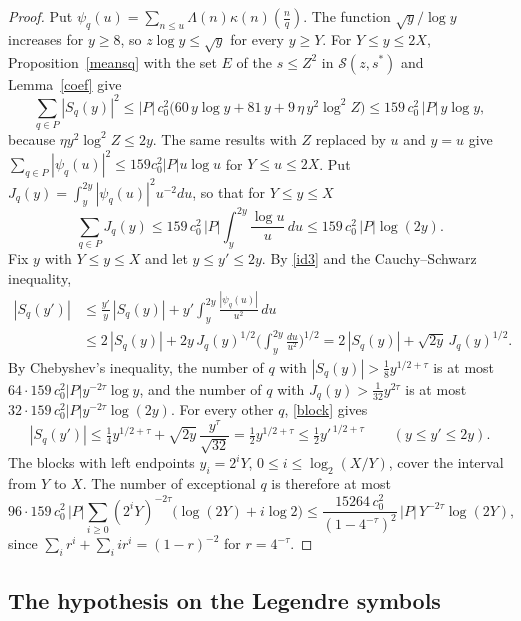 \documentclass[11pt,letterpaper]{article}
\numberwithin{equation}{section}
\begin{document}
\begin{proof}
Put $\psi_q(u)=\sum_{n\le u}\Lambda(n)\kappa(n)(\tfrac nq)$. The function $\sqrt y/\log y$ increases for $y\ge8$, so $z\log y\le\sqrt y$ for every $y\ge Y$. For $Y\le y\le2X$, Proposition~\ref{meansq} with the set $E$ of the $s\le Z^2$ in $\mathcal S(z,s^\ast)$ and Lemma~\ref{coef} give
\[
\sum_{q\in P}|S_q(y)|^2\le|P|\,c_0^2\Big(60\,y\log y+81\,y+9\,\eta\,y^2\log^2Z\Big)\le159\,c_0^2\,|P|\,y\log y ,
\]
because $\eta y^2\log^2Z\le2y$. The same results with $Z$ replaced by $u$ and $y=u$ give $\sum_{q\in P}|\psi_q(u)|^2\le159c_0^2|P|u\log u$ for $Y\le u\le2X$. Put $J_q(y)=\int_y^{2y}|\psi_q(u)|^2u^{-2}du$, so that for $Y\le y\le X$
\[
\sum_{q\in P}J_q(y)\le159\,c_0^2\,|P|\int_y^{2y}\frac{\log u}u\,du\le159\,c_0^2\,|P|\log(2y).
\]
Fix $y$ with $Y\le y\le X$ and let $y\le y'\le2y$. By \eqref{id3} and the Cauchy--Schwarz inequality,
\begin{equation}\label{block}
\begin{aligned}
|S_q(y')|&\le\frac{y'}y\,|S_q(y)|+y'\int_y^{2y}\frac{|\psi_q(u)|}{u^2}\,du\\
&\le2\,|S_q(y)|+2y\,J_q(y)^{1/2}\Big(\int_y^{2y}\frac{du}{u^2}\Big)^{1/2}=2\,|S_q(y)|+\sqrt{2y}\,J_q(y)^{1/2}.
\end{aligned}
\end{equation}
By Chebyshev's inequality, the number of $q$ with $|S_q(y)|>\tfrac18y^{1/2+\tau}$ is at most $64\cdot159\,c_0^2|P|y^{-2\tau}\log y$, and the number of $q$ with $J_q(y)>\tfrac1{32}y^{2\tau}$ is at most $32\cdot159\,c_0^2|P|y^{-2\tau}\log(2y)$. For every other $q$, \eqref{block} gives
\[
|S_q(y')|\le\tfrac14y^{1/2+\tau}+\sqrt{2y}\,\frac{y^{\tau}}{\sqrt{32}}=\tfrac12y^{1/2+\tau}\le\tfrac12y'^{\,1/2+\tau}\qquad(y\le y'\le2y).
\]
The blocks with left endpoints $y_i=2^iY$, $0\le i\le\log_2(X/Y)$, cover the interval from $Y$ to $X$. The number of exceptional $q$ is therefore at most
\[
96\cdot159\,c_0^2\,|P|\sum_{i\ge0}(2^iY)^{-2\tau}\big(\log(2Y)+i\log2\big)\le\frac{15264\,c_0^2}{(1-4^{-\tau})^2}\,|P|\,Y^{-2\tau}\log(2Y),
\]
since $\sum_ir^i+\sum_iir^i=(1-r)^{-2}$ for $r=4^{-\tau}$.
\end{proof}

\subsection{The hypothesis on the Legendre symbols}
\end{document}
